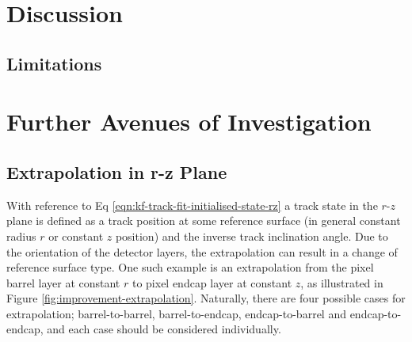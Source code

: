 









\section{Discussion}
\subsection{Limitations}


\section{Further Avenues of Investigation}
\subsection{Extrapolation in r-z Plane}

With reference to Eq \ref{eqn:kf-track-fit-initialised-state-rz} a track state in the $r$-$z$ plane is defined as a track position at some reference surface (in general constant radius $r$ or constant $z$ position) and the inverse track inclination angle. Due to the orientation of the detector layers, the extrapolation can result in a change of reference surface type. One such example is an extrapolation from the pixel barrel layer at constant $r$ to pixel endcap layer at constant $z$, as illustrated in Figure \ref{fig:improvement-extrapolation}. Naturally, there are four possible cases for extrapolation; barrel-to-barrel, barrel-to-endcap, endcap-to-barrel and endcap-to-endcap, and each case should be considered individually.


